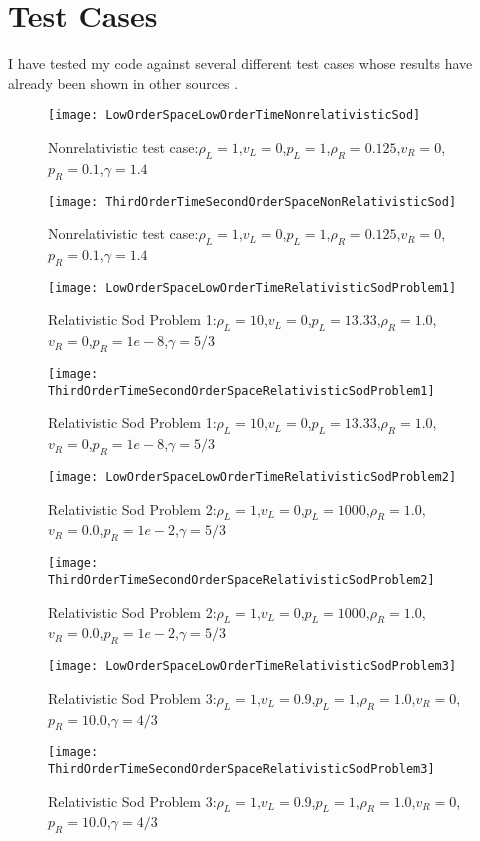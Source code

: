 \pagebreak
\section{Test Cases}
I have tested my code against several different test cases whose results have already been shown in other sources \cite{macfadyen}. 
\begin{figure}[H]
        \centering
        \texttt{[image: LowOrderSpaceLowOrderTimeNonrelativisticSod]}
        \caption{Nonrelativistic test case:$\rho_L=1$,$v_L=0$,$p_L=1$,$\rho_R=0.125$,$v_R=0$,$p_R=0.1$,$\gamma=1.4$ }
\end{figure}

\begin{figure}[H]
        \centering
        \texttt{[image: ThirdOrderTimeSecondOrderSpaceNonRelativisticSod]}
        \caption{Nonrelativistic test case:$\rho_L=1$,$v_L=0$,$p_L=1$,$\rho_R=0.125$,$v_R=0$,$p_R=0.1$,$\gamma=1.4$ }
\end{figure}

\begin{figure}[H]
        \centering
        \texttt{[image: LowOrderSpaceLowOrderTimeRelativisticSodProblem1]}
        \caption{Relativistic Sod Problem 1:$\rho_L=10$,$v_L=0$,$p_L=13.33$,$\rho_R=1.0$,$v_R=0$,$p_R=1e-8$,$\gamma=5/3$ }
\end{figure}

\begin{figure}[H]
        \centering
        \texttt{[image: ThirdOrderTimeSecondOrderSpaceRelativisticSodProblem1]}
        \caption{Relativistic Sod Problem 1:$\rho_L=10$,$v_L=0$,$p_L=13.33$,$\rho_R=1.0$,$v_R=0$,$p_R=1e-8$,$\gamma=5/3$ }
\end{figure}

\begin{figure}[H]
        \centering
        \texttt{[image: LowOrderSpaceLowOrderTimeRelativisticSodProblem2]}
        \caption{Relativistic Sod Problem 2:$\rho_L=1$,$v_L=0$,$p_L=1000$,$\rho_R=1.0$,$v_R=0.0$,$p_R=1e-2$,$\gamma=5/3$ }
\end{figure}

\begin{figure}[H]
        \centering
        \texttt{[image: ThirdOrderTimeSecondOrderSpaceRelativisticSodProblem2]}
        \caption{Relativistic Sod Problem 2:$\rho_L=1$,$v_L=0$,$p_L=1000$,$\rho_R=1.0$,$v_R=0.0$,$p_R=1e-2$,$\gamma=5/3$ }
\end{figure}

\begin{figure}[H]
        \centering
        \texttt{[image: LowOrderSpaceLowOrderTimeRelativisticSodProblem3]}
        \caption{Relativistic Sod Problem 3:$\rho_L=1$,$v_L=0.9$,$p_L=1$,$\rho_R=1.0$,$v_R=0$,$p_R=10.0$,$\gamma=4/3$ }
\end{figure}

\begin{figure}[H]
        \centering
        \texttt{[image: ThirdOrderTimeSecondOrderSpaceRelativisticSodProblem3]}
        \caption{Relativistic Sod Problem 3:$\rho_L=1$,$v_L=0.9$,$p_L=1$,$\rho_R=1.0$,$v_R=0$,$p_R=10.0$,$\gamma=4/3$ }
\end{figure}

